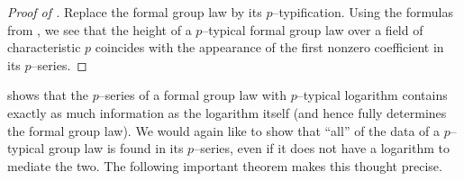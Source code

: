 \begin{proof}[{Proof of }]
Replace the formal group law by its $p$--typification.  Using the formulas from , we see that the height of a $p$--typical formal group law over a field of characteristic $p$ coincides with the appearance of the first nonzero coefficient in its $p$--series.
\end{proof}

 shows that the $p$--series of a formal group law with $p$--typical logarithm contains exactly as much information as the logarithm itself (and hence fully determines the formal group law).  We would again like to show that ``all'' of the data of a $p$--typical group law is found in its $p$--series, even if it does not have a logarithm to mediate the two.  The following important theorem makes this thought precise.

